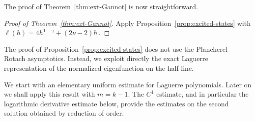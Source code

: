 \documentclass[11pt]{amsart}
\numberwithin{equation}{section}
\theoremstyle{remark}
\begin{document}
The proof of Theorem~\ref{thm:ext-Gannot} is  now straightforward.
\begin{proof}[Proof of Theorem~\ref{thm:ext-Gannot}]
Apply Proposition~\ref{prop:excited-states} with $\ell(h)=4h^{1-\gamma}+(2\nu-2)h$\,.
\end{proof}
%
%
The proof of Proposition~\ref{prop:excited-states} does not  use the Plancherel--Rotach asymptotics.
Instead, we exploit directly the exact Laguerre representation of
the normalized eigenfunction on the half-line.

\medskip\noindent
We start with an elementary uniform estimate for Laguerre
polynomials. Later on we shall apply this result with $m=k-1$.
The $C^1$ estimate, and in particular the logarithmic derivative
estimate below, provide the estimates on the second
solution obtained by reduction of order.
\end{document}
